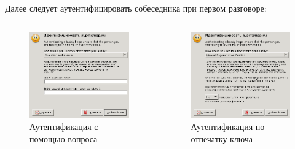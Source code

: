 \documentclass[presentation]{beamer}
\begin{document}
\begin{frame}{}
Далее следует аутентифицировать собеседника при первом разговоре:
\begin{columns}
\begin{column}{0.5\textwidth}
  \begin{figure}[htb]
    \centering
    \includegraphics[clip,width=0.5\textheight]{./pidgin-otr-4}
    \caption{Аутентификация с помощью вопроса}
  \end{figure}
\end{column}
\begin{column}{0.5\textwidth}
  \begin{figure}[htb]
    \centering
    \includegraphics[clip,width=0.5\textheight]{./pidgin-otr-5}
    \caption{Аутентификация по отпечатку ключа}
  \end{figure}
\end{column}
\end{columns}
\end{frame}
\end{document}
